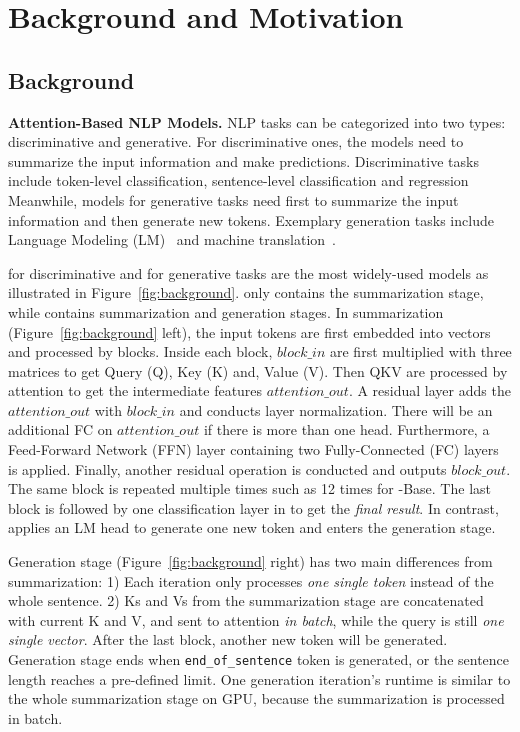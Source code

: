 \section{Background and Motivation}



\subsection{Background}
\textbf{Attention-Based NLP Models.}
NLP tasks can be categorized into two types: discriminative and generative. For discriminative ones, the models need to summarize the input information and make predictions. Discriminative tasks include token-level classification\cite{tjong-kim-sang-de-meulder-2003-introduction}, sentence-level classification and regression~\cite{socher-etal-2013-recursive} \etc 
Meanwhile, models for generative tasks need first to summarize the input information and then generate new tokens. Exemplary generation tasks include Language Modeling (LM)~\cite{radford2019language} and machine translation~\cite{46201}.

\bert for discriminative and \gpttwo for generative tasks are the most widely-used models as illustrated in  Figure~\ref{fig:background}. \bert only contains the summarization stage, while \gpttwo contains summarization and generation stages. In summarization (Figure~\ref{fig:background} left), the input tokens are first embedded into vectors and processed by blocks. Inside each block, $block\_in$ are first multiplied with three matrices to get Query (Q), Key (K) and, Value (V). Then QKV are processed by attention to get the intermediate features $attention\_out$. A residual layer adds the $attention\_out$ with $block\_in$ and conducts layer normalization. There will be an additional FC on $attention\_out$ if there is more than one head. Furthermore, a Feed-Forward Network (FFN) layer containing two Fully-Connected (FC) layers is applied. Finally, another residual operation is conducted and outputs $block\_out$.
The same block is repeated multiple times such as 12 times for \bert-Base. The last block is followed by one classification layer in \bert to get the \emph{final result}. In contrast, \gpttwo applies an LM head to generate one new token and enters the generation stage.

Generation stage (Figure~\ref{fig:background} right) has two main differences from summarization: 1) Each iteration only processes \emph {one single token} instead of the whole sentence. 2) Ks and Vs from the summarization stage are concatenated with current K and V, and sent to attention \emph{in batch}, while the query is still \emph{one single vector}. After the last block, another new token will be generated. Generation stage ends when \texttt{end\_of\_sentence} token is generated, or the sentence length reaches a pre-defined limit. One generation iteration's runtime is similar to the whole summarization stage on GPU, because the summarization is processed in batch.

